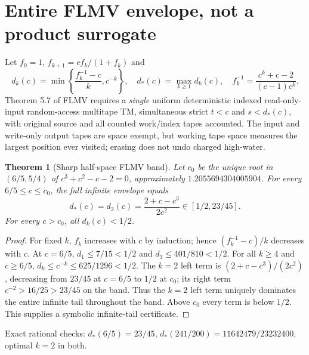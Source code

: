 \documentclass[10pt]{article}
\newtheorem{theorem}{Theorem}
\begin{document}
\section{Entire FLMV envelope, not a product surrogate}
Let $f_0=1$, $f_{k+1}=cf_k/(1+f_k)$ and
\[
d_k(c)=\min\left\{\frac{f_k^{-1}-c}{k},c^{-k}\right\},
\quad d_*(c)=\max_{k\ge1}d_k(c),
\quad f_k^{-1}=\frac{c^k+c-2}{(c-1)c^k}.
\]
Theorem 5.7 of FLMV \cite{FLMV} requires a \emph{single} uniform deterministic indexed read-only-input random-access multitape TM, simultaneous strict $t<c$ and $s<d_*(c)$, with original source and all counted work/index tapes accounted. The input and write-only output tapes are space exempt, but working tape space measures the largest position ever visited; erasing does not undo charged high-water.
\begin{theorem}[Sharp half-space FLMV band]
Let $c_0$ be the unique root in $(6/5,5/4)$ of $c^3+c^2-c-2=0$, approximately $1.2055694304005904$. For every $6/5\le c\le c_0$, the full infinite envelope equals
\[
\boxed{d_*(c)=d_2(c)=\frac{2+c-c^3}{2c^2}\in[1/2,23/45]}.
\]
For every $c>c_0$, all $d_k(c)<1/2$.
\end{theorem}
\begin{proof}
For fixed $k$, $f_k$ increases with $c$ by induction; hence $(f_k^{-1}-c)/k$ decreases with $c$. At $c=6/5$,
$d_1\le7/15<1/2$ and $d_3\le401/810<1/2$.
For all $k\ge4$ and $c\ge6/5$, $d_k\le c^{-k}\le625/1296<1/2$.
The $k=2$ left term is $(2+c-c^3)/(2c^2)$, decreasing from $23/45$ at $c=6/5$ to $1/2$ at $c_0$; its right term $c^{-2}>16/25>23/45$ on the band. Thus the $k=2$ left term uniquely dominates the entire infinite tail throughout the band. Above $c_0$ every term is below $1/2$. This supplies a symbolic infinite-tail certificate.
\end{proof}
Exact rational checks: $d_*(6/5)=23/45$, $d_*(241/200)=11642479/23232400$, optimal $k=2$ in both.
\end{document}
